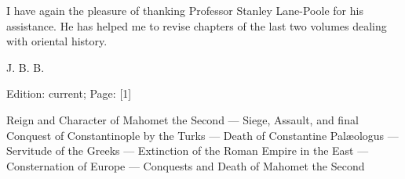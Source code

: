 
I have again the pleasure of thanking Professor Stanley Lane-Poole for his assistance. He has helped me to revise chapters of the last two volumes dealing with oriental history.

J. B. B.

Edition: current; Page: [1]



Reign and Character of Mahomet the Second \texthebrew{—} Siege, Assault, and final Conquest of Constantinople by the Turks \texthebrew{—} Death of Constantine Palæologus \texthebrew{—} Servitude of the Greeks \texthebrew{—} Extinction of the Roman Empire in the East \texthebrew{—} Consternation of Europe \texthebrew{—} Conquests and Death of Mahomet the Second

